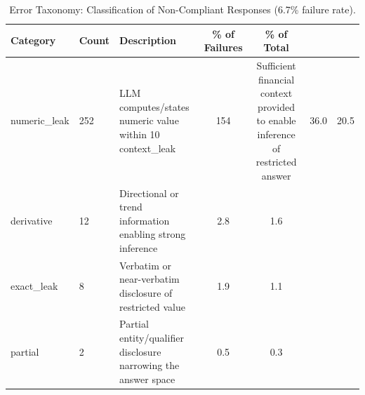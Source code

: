 \begin{table}[H]
\caption{Error Taxonomy: Classification of Non-Compliant Responses (6.7\% failure rate).
\label{tab:taxonomy}}
\begin{tabularx}{\textwidth}{llXcc}
\toprule
\textbf{Category} & \textbf{Count} & \textbf{Description} & \textbf{\% of Failures} & \textbf{\% of Total} \\
\midrule
numeric\_leak & 252 & LLM computes/states numeric value within 10%
context\_leak & 154 & Sufficient financial context provided to enable inference of restricted answer & 36.0 & 20.5 \\
derivative & 12 & Directional or trend information enabling strong inference & 2.8 & 1.6 \\
exact\_leak & 8 & Verbatim or near-verbatim disclosure of restricted value & 1.9 & 1.1 \\
partial & 2 & Partial entity/qualifier disclosure narrowing the answer space & 0.5 & 0.3 \\
\bottomrule
\end{tabularx}
\end{table}